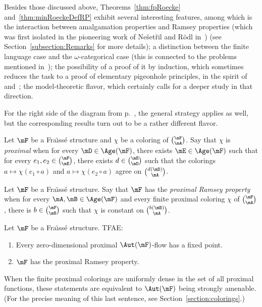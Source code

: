 Besides those discussed above, Theorems~\ref{thm:fpRoecke} and~\ref{thm:minRoeckeDefRP} exhibit several interesting features, among which is the interaction between amalgamation properties and Ramsey properties (which was first isolated in the pioneering work of Ne\v set\v ril and R\"odl in~\cite{NR2}) (see Section~\ref{subsection:Remarks} for more details); a distinction between the finite language case and the $\omega$-categorical case (this is connected to the problems mentioned in~\cite[Section~7]{BPT}); the possibility of a proof of it by induction, which sometimes reduces the task to a proof of elementary pigeonhole principles, in the spirit of~\cite{T} and~\cite{Sol4}; the model-theoretic flavor, which certainly calls for a deeper study in that direction.

For the right side of the diagram from p.~\pageref{firstdiagram}, the general strategy applies as well, but the corresponding results turn out to be a rather different flavor.

\begin{defi}\label{def:proxcoloring}
Let $\mF$ be a Fra\"{\i}ss\'e structure and $\chi$ be a coloring of $\binom{\mF}{\mA}$. Say that $\chi$ is \emph{proximal} when for every $\mD \in \Age(\mF)$, there exists $\mE \in \Age(\mF)$ such that for every $e_{1}, e_{2}\in \binom{\mF}{\mE}$, there exists $d\in \binom{\mE}{\mD}$ such that the colorings $a\mapsto \chi(e_{1}\circ a)$ and $a\mapsto \chi(e_{2}\circ a)$ agree on $\binom{d(\mD)}{\mA}$.
\end{defi}

\begin{defi}
Let $\mF$ be a Fra\"{\i}ss\'e structure. Say that $\mF$ has the \emph{proximal Ramsey property} when for every $\mA, \mB \in \Age(\mF)$ and every finite proximal coloring $\chi$ of $\binom{\mF}{\mA}$, there is $b\in \binom{\mF}{\mB}$ such that $\chi$ is constant on $\binom{b(\mB)}{\mA}$.
\end{defi}

\begin{theo}\label{thm:SAProxRP}
Let $\mF$ be a Fra\"{\i}ss\'e structure. TFAE:
\begin{enumerate}
\item Every zero-dimensional proximal $\Aut(\mF)$-flow has a fixed point.
\item $\mF$ has the proximal Ramsey property.
\end{enumerate}
When the finite proximal colorings are uniformly dense in the set of all proximal functions, these statements are equivalent to $\Aut(\mF)$ being strongly amenable. (For the precise meaning of this last sentence, see Section~\ref{section:colorings}.)
\end{theo}

